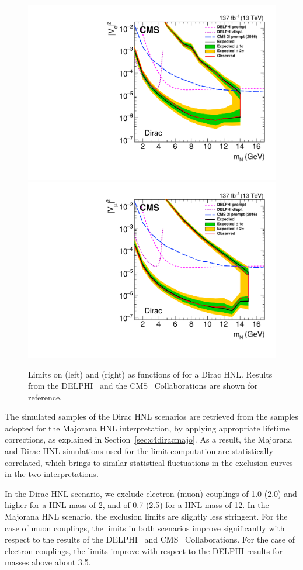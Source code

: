 \begin{figure}[!ht]
    \centering
    \includegraphics[width=.48\textwidth]{Figures/paper/dirac_ele.pdf}
    \hfill
    \includegraphics[width=.48\textwidth]{Figures/paper/dirac_muo.pdf}
    \caption{\label{fig:limits_Dir}
        Limits on \mixpare (left) and \mixparm (right) as
        functions of \mhnl for a Dirac HNL. Results from the DELPHI~\cite{Abreu:1996pa}
        and the CMS~\cite{Sirunyan:2018mtv} Collaborations are shown for reference.
    }
\end{figure}

The simulated samples of the Dirac HNL scenarios are retrieved from
the samples adopted for the Majorana HNL interpretation, by
applying appropriate lifetime corrections, as explained in Section~\ref{sec:c4diracmajo}.
As a result, the Majorana and Dirac HNL simulations used for the limit
computation are statistically correlated, which brings to
similar statistical fluctuations in the exclusion curves in the two
interpretations.

In the Dirac HNL scenario, we exclude electron (muon) couplings of 1.0 (2.0) and higher for a HNL mass of 2\GeV, and of 0.7 (2.5) for a HNL mass of 12\GeV.
In the Majorana HNL scenario, the exclusion limits are slightly less stringent.
For the case of muon couplings, the limits in both scenarios improve
significantly with respect to the results of the
DELPHI~\cite{Abreu:1996pa} and
CMS~\cite{Sirunyan:2018mtv} Collaborations.
For the case of electron couplings, the limits improve with
respect to the DELPHI results for masses above about 3.5\GeV.


